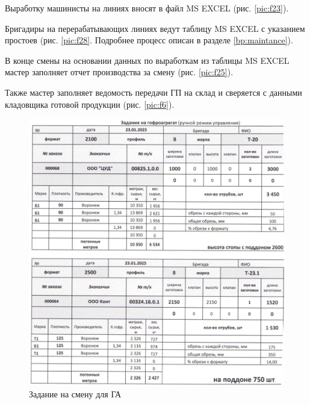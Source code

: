 Выработку машинисты на линиях вносят в файл MS EXCEL  (рис. \ref{pic:f23}).


Бригадиры на перерабатывающих линиях ведут таблицу MS EXCEL с указанием простоев (рис. \ref{pic:f28}. Подробнее процесс описан в разделе \ref{bp:maintance}).

В конце смены на основании данных по выработкам из таблицы MS EXCEL мастер заполняет отчет производства за смену (рис. \ref{pic:f25}).

Также мастер заполняет ведомость передачи ГП на склад и сверяется с данными кладовщика готовой продукции (рис. \ref{pic:f6}).




\begin{figure}
\begin{center}
 \includegraphics[width=\linewidth, height=0.94\textheight, keepaspectratio]{Pics/f29.jpg}
\end{center}
\caption{Задание на смену для ГА}
\label{pic:f29}
\end{figure}

